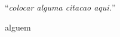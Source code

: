 \documentclass[
12pt, %
oneside, %
english, brazil, %
doublespacing,
nolistspacing, %
liststotoc, %
]{MastersDoctoralThesis} %
\begin{document}
\cleardoublepage

%
%
%
% 
% 
%


\vspace*{0.2\textheight}

\noindent\enquote{\itshape colocar alguma citacao aqui.}\bigbreak

\hfill alguem
\cleardoublepage
\end{document}
